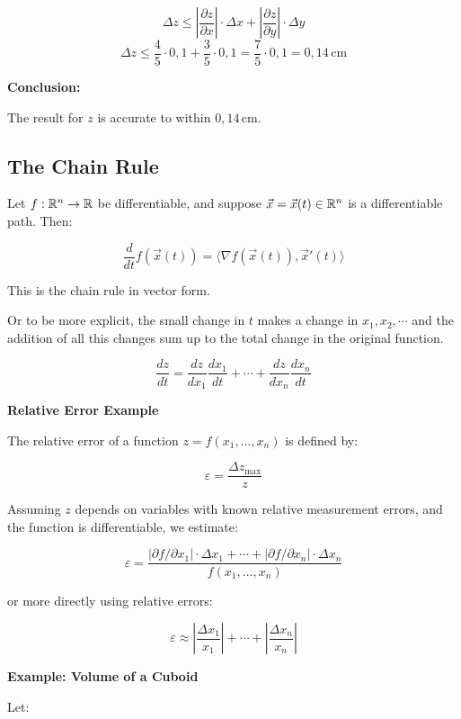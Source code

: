 \[
    \Delta z \leq \left| \frac{\partial z}{\partial x} \right| \cdot \Delta x + \left| \frac{\partial z}{\partial y} \right| \cdot \Delta y
\]
\[
    \Delta z \leq \frac{4}{5} \cdot 0{,}1 + \frac{3}{5} \cdot 0{,}1 = \frac{7}{5} \cdot 0{,}1 = 0{,}14 \, \text{cm}
\]

\textbf{Conclusion:}  

The result for \( z \) is accurate to within \( \boxed{0{,}14 \, \text{cm}} \).


\subsection{The Chain Rule}

Let \( f : \mathbb{R}^n \to \mathbb{R} \) be differentiable, and suppose \( \vec{x} = \vec{x}(t) \in \mathbb{R}^n \) is a differentiable path. Then:

\[
    \frac{d}{dt} f(\vec{x}(t)) = \langle \nabla f(\vec{x}(t)), \vec{x}'(t) \rangle
\]

This is the chain rule in vector form.

Or to be more explicit, the small change in \(t\) makes a change in \(x_1, x_2, \cdots\) and the addition of all this changes
sum up to the total change in the original function.

\[
    \frac{dz}{dt} = \frac{dz}{dx_1}\frac{dx_1}{dt} + \cdots + \frac{dz}{dx_n}\frac{dx_n}{dt}
\]

\textbf{Relative Error Example}
\vspace{\baselineskip}

The relative error of a function \( z = f(x_1, \dots, x_n) \) is defined by:

\[
    \varepsilon = \frac{\Delta z_{\max}}{z}
\]

Assuming \( z \) depends on variables with known relative measurement errors, and the function is differentiable, we estimate:

\[
    \varepsilon = \frac{|\partial f / \partial x_1| \cdot \Delta x_1 + \cdots + |\partial f / \partial x_n| \cdot \Delta x_n}{f(x_1, \dots, x_n)}
\]

or more directly using relative errors:

\[
    \varepsilon \approx \left| \frac{\Delta x_1}{x_1} \right| + \cdots + \left| \frac{\Delta x_n}{x_n} \right|
\]

\textbf{Example: Volume of a Cuboid}
\vspace{\baselineskip}

Let:

